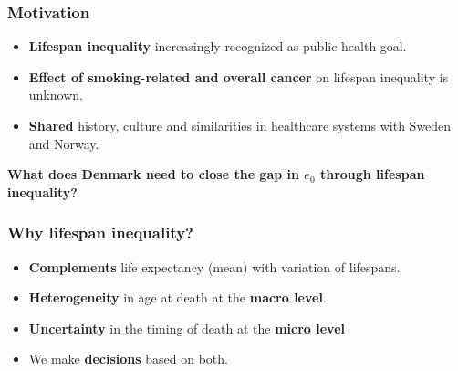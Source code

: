 \documentclass[xcolor={dvipsnames}]{beamer}
\begin{document}
\begin{frame}\frametitle{Motivation}
\large{
		\begin{itemize}
		
		\item \textbf{Lifespan inequality} increasingly recognized as public health goal.\pause
		
		\item \textbf{Effect of smoking-related and overall cancer} on lifespan inequality is unknown. \pause
		
		\item \textbf{Shared} history, culture and similarities in healthcare systems with Sweden and Norway. 
		\end{itemize}
		\pause
		
		\begin{center}
		\Large{\textbf{What does Denmark need to close the gap in $e_0$
		through lifespan inequality?}}
		\end{center}
		
}

\end{frame}




\begin{frame}\frametitle{Why lifespan inequality?}
\Large{
		\begin{itemize}
		
		\item<1-> \textbf{Complements} life expectancy (mean) with variation of lifespans.

		\item<2-> \textbf{Heterogeneity} in age at death at the \textbf{macro level}.
		
		\item<3-> \textbf{Uncertainty} in the timing of death at the \textbf{micro level}
		
		\item<4-> We make \textbf{decisions} based on both.
						
		\end{itemize}

}
\end{frame}
\end{document}
